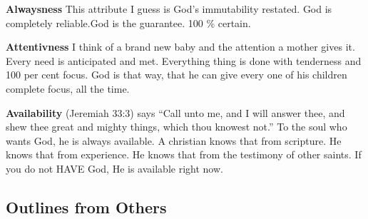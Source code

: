 \begin{compactenum}[I.][19]
    \item \textbf{Alwaysness} This attribute I guess is God's immutability restated. God is completely reliable.God is the guarantee. 100 \% certain. %
    \item \textbf{Attentivness} I think of a brand new baby and the attention a mother gives it. Every need is anticipated and met. Everything thing is done with tenderness and 100 per cent focus. God is that way, that he can give every one of his children complete focus, all the time.
    \item \textbf{Availability}  (Jeremiah 33:3) says ``Call unto me, and I will answer thee, and shew thee great and mighty things, which thou knowest not.''  To the soul who wants God, he is always available. A christian knows that  from scripture. He knows that from experience. He knows that from the testimony of other saints. If you do not HAVE God, He is available right now. 
\end{compactenum}

\subsection{Outlines from Others}

